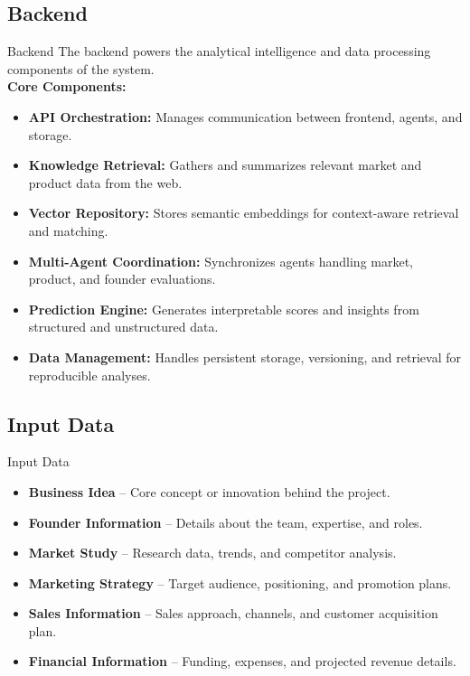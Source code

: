\documentclass{beamer}
\begin{document}
\subsection{Backend}
\begin{frame}{Backend}
    The backend powers the analytical intelligence and data processing components of the system.\\[8pt]
    \textbf{Core Components:}
    \begin{itemize}
        \item \textbf{API Orchestration:} Manages communication between frontend, agents, and storage.
        \item \textbf{Knowledge Retrieval:} Gathers and summarizes relevant market and product data from the web.
        \item \textbf{Vector Repository:} Stores semantic embeddings for context-aware retrieval and matching.
        \item \textbf{Multi-Agent Coordination:} Synchronizes agents handling market, product, and founder evaluations.
        \item \textbf{Prediction Engine:} Generates interpretable scores and insights from structured and unstructured data.
        \item \textbf{Data Management:} Handles persistent storage, versioning, and retrieval for reproducible analyses.
    \end{itemize}
\end{frame}

\subsection{Input Data}
\begin{frame}{Input Data}
    \begin{itemize}
        \item \textbf{Business Idea} – Core concept or innovation behind the project.
        \item \textbf{Founder Information} – Details about the team, expertise, and roles.
        \item \textbf{Market Study} – Research data, trends, and competitor analysis.
        \item \textbf{Marketing Strategy} – Target audience, positioning, and promotion plans.
        \item \textbf{Sales Information} – Sales approach, channels, and customer acquisition plan.
        \item \textbf{Financial Information} – Funding, expenses, and projected revenue details.
    \end{itemize}
\end{frame}
\end{document}
